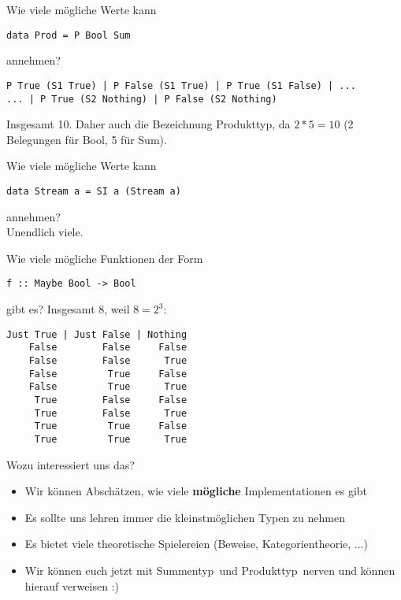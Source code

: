 \documentclass{beamer}
\begin{document}
\begin{frame}[fragile]
Wie viele mögliche Werte kann
\begin{verbatim}
data Prod = P Bool Sum
\end{verbatim}
annehmen?
\pause
\begin{verbatim}
P True (S1 True) | P False (S1 True) | P True (S1 False) | ...
... | P True (S2 Nothing) | P False (S2 Nothing)
\end{verbatim}
Insgesamt 10. Daher auch die Bezeichnung Produkttyp, da $2*5 = 10$ (2 Belegungen für Bool, 5 für Sum).
\end{frame}

\begin{frame}[fragile]
Wie viele mögliche Werte kann
\begin{verbatim}
data Stream a = SI a (Stream a)
\end{verbatim}
annehmen?\\
\pause
Unendlich viele.
\end{frame}

\begin{frame}[fragile]
Wie viele mögliche Funktionen der Form
\begin{verbatim}
f :: Maybe Bool -> Bool
\end{verbatim}
gibt es?
\pause
Insgesamt 8, weil $8 = 2^3$:
\begin{verbatim}
Just True | Just False | Nothing
    False        False     False
    False        False      True
    False         True     False
    False         True      True
     True        False     False
     True        False      True
     True         True     False
     True         True      True
\end{verbatim}
\end{frame}

\begin{frame}[fragile]
Wozu interessiert uns das?
\pause
\begin{itemize}
 \item Wir können Abschätzen, wie viele \textbf{mögliche} Implementationen es gibt
 \item Es sollte uns lehren immer die kleinstmöglichen Typen zu nehmen
 \item Es bietet viele theoretische Spielereien (Beweise, Kategorientheorie, ...)
 \pause
 \item Wir können euch jetzt mit \glqq Summentyp\grqq \ und \glqq Produkttyp\grqq \ nerven und können hierauf verweisen :)
\end{itemize}

\end{frame}
\end{document}
